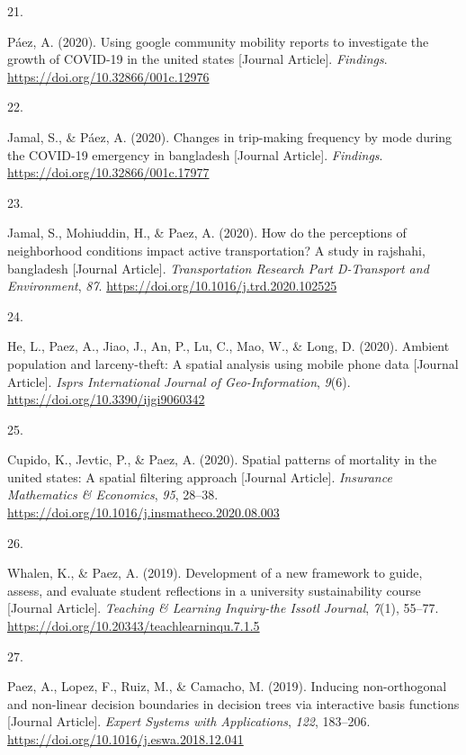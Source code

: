 \documentclass[11pt,a4paper,]{awesome-cv}
\newlength{\csllabelwidth}
\newcommand{\CSLLeftMargin}[1]{\parbox[t]{\csllabelwidth}{#1}}
\newcommand{\CSLRightInline}[1]{\parbox[t]{\linewidth - \csllabelwidth}{#1}}
\begin{document}
\leavevmode{}%
\CSLLeftMargin{21. }
\CSLRightInline{Páez, A. (2020). Using google community mobility reports
to investigate the growth of COVID-19 in the united states {[}Journal
Article{]}. \emph{Findings}. \url{https://doi.org/10.32866/001c.12976}}

\leavevmode{}%
\CSLLeftMargin{22. }
\CSLRightInline{Jamal, S., \& Páez, A. (2020). Changes in trip-making
frequency by mode during the COVID-19 emergency in bangladesh {[}Journal
Article{]}. \emph{Findings}. \url{https://doi.org/10.32866/001c.17977}}

\leavevmode{}%
\CSLLeftMargin{23. }
\CSLRightInline{Jamal, S., Mohiuddin, H., \& Paez, A. (2020). How do the
perceptions of neighborhood conditions impact active transportation? A
study in rajshahi, bangladesh {[}Journal Article{]}.
\emph{Transportation Research Part D-Transport and Environment},
\emph{87}. \url{https://doi.org/10.1016/j.trd.2020.102525}}

\leavevmode{}%
\CSLLeftMargin{24. }
\CSLRightInline{He, L., Paez, A., Jiao, J., An, P., Lu, C., Mao, W., \&
Long, D. (2020). Ambient population and larceny-theft: A spatial
analysis using mobile phone data {[}Journal Article{]}. \emph{Isprs
International Journal of Geo-Information}, \emph{9}(6).
\url{https://doi.org/10.3390/ijgi9060342}}

\leavevmode{}%
\CSLLeftMargin{25. }
\CSLRightInline{Cupido, K., Jevtic, P., \& Paez, A. (2020). Spatial
patterns of mortality in the united states: A spatial filtering approach
{[}Journal Article{]}. \emph{Insurance Mathematics \& Economics},
\emph{95}, 28--38.
\url{https://doi.org/10.1016/j.insmatheco.2020.08.003}}

\leavevmode{}%
\CSLLeftMargin{26. }
\CSLRightInline{Whalen, K., \& Paez, A. (2019). Development of a new
framework to guide, assess, and evaluate student reflections in a
university sustainability course {[}Journal Article{]}. \emph{Teaching
\& Learning Inquiry-the Issotl Journal}, \emph{7}(1), 55--77.
\url{https://doi.org/10.20343/teachlearninqu.7.1.5}}

\leavevmode{}%
\CSLLeftMargin{27. }
\CSLRightInline{Paez, A., Lopez, F., Ruiz, M., \& Camacho, M. (2019).
Inducing non-orthogonal and non-linear decision boundaries in decision
trees via interactive basis functions {[}Journal Article{]}.
\emph{Expert Systems with Applications}, \emph{122}, 183--206.
\url{https://doi.org/10.1016/j.eswa.2018.12.041}}
\end{document}
